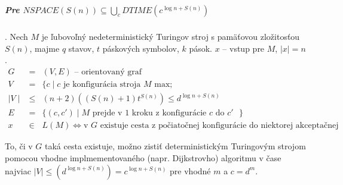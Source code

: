 \documentclass{article}
\begin{document}
\subparagraph{Pre $NSPACE(S(n)) \subseteq \bigcup_c DTIME(c^{\log n + S(n)})$}. 
Nech $M$ je ľubovoľný nedeterministický Turingov stroj s pamäťovou
zložitosťou $S(n)$, majme $q$ stavov, $t$ páskových symbolov, $k$ pások. $x$ --
vstup pre $M$, $\mid x\mid = n$.
$$
\begin{array}{lll}
	G & = &(V,E) \mbox{ -- orientovaný graf} \\
	V & = & \{c \mid c \mbox{ je konfigurácia stroja $M$ max}; \\
	\mid V \mid & \leq & (n+2)( (S(n)+1)t^{S(n)} ) \leq d^{\log n + S(n)} \\
	E & = & \{ (c,c') \mid \mbox{$M$ prejde v 1 kroku z konfigurácie $c$ do
	$c'$ } \}\\
	x & \in & L(M) \iff \mbox{v $G$ existuje cesta z počiatočnej
	konfigurácie do niektorej akceptačnej konfigurácie}
\end{array}
$$

To, či v $G$ taká cesta existuje, možno zistiť deterministickým Turingovým
strojom pomocou vhodne implmementovaného (napr. Dijkstrovho) algoritmu v čase
najviac $\mid V \mid \leq (d^{\log n + S(n)}) = c^{\log n + S(n)}$ pre vhodné
$m$ a $c=d^m$.
\end{document}
